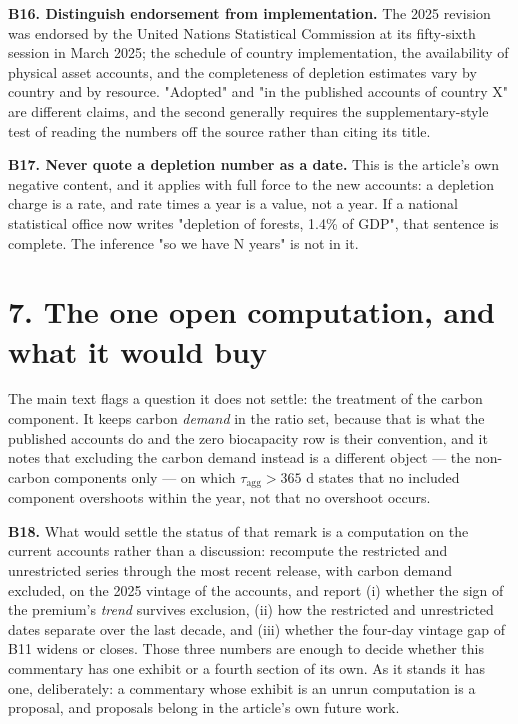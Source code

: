 \documentclass[11pt]{article}
\begin{document}
\textbf{B16. Distinguish endorsement from implementation.} The 2025 revision was endorsed by the United Nations Statistical Commission at its fifty-sixth session in March 2025; the schedule of country implementation, the availability of physical asset accounts, and the completeness of depletion estimates vary by country and by resource. "Adopted" and "in the published accounts of country X" are different claims, and the second generally requires the supplementary-style test of reading the numbers off the source rather than citing its title.

\textbf{B17. Never quote a depletion number as a date.} This is the article's own negative content, and it applies with full force to the new accounts: a depletion charge is a rate, and rate times a year is a value, not a year. If a national statistical office now writes "depletion of forests, 1.4\% of GDP", that sentence is complete. The inference "so we have N years" is not in it.

\vspace{0.8em}

\section*{7. The one open computation, and what it would buy}\label{7-the-one-open-computation-and-what-it-would-buy}

The main text flags a question it does not settle: the treatment of the carbon component. It keeps carbon \emph{demand} in the ratio set, because that is what the published accounts do and the zero biocapacity row is their convention, and it notes that excluding the carbon demand instead is a different object --- the non-carbon components only --- on which \(\tau_{\mathrm{agg}} > 365\) d states that no included component overshoots within the year, not that no overshoot occurs.

\textbf{B18.} What would settle the status of that remark is a computation on the current accounts rather than a discussion: recompute the restricted and unrestricted series through the most recent release, with carbon demand excluded, on the 2025 vintage of the accounts, and report (i) whether the sign of the premium's \emph{trend} survives exclusion, (ii) how the restricted and unrestricted dates separate over the last decade, and (iii) whether the four-day vintage gap of B11 widens or closes. Those three numbers are enough to decide whether this commentary has one exhibit or a fourth section of its own. As it stands it has one, deliberately: a commentary whose exhibit is an unrun computation is a proposal, and proposals belong in the article's own future work.
\end{document}
